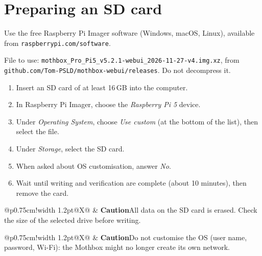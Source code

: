 \documentclass[10pt,a4paper]{article}
\makeatletter
\newcommand{\avert}[2]{%
  \par\smallskip\noindent
  \begin{tabularx}{\linewidth}{@{}p{0.75cm}!{\color{black}\vrule width 1.2pt}@{\hspace{6pt}}X@{}}
  \raisebox{-2pt}{\Large\faExclamationTriangle} & \textbf{#1}\quad #2
  \end{tabularx}\par\smallskip}
\makeatother
\begin{document}
\newpage
\begin{minipage}[t]{0.52\textwidth}
\vspace{0pt}
\section{Preparing an SD card}
Use the free Raspberry Pi Imager software (Windows, macOS, Linux), available from \texttt{raspberrypi.com/software}.

File to use: \texttt{mothbox\_Pro\_Pi5\_v5.2.1-webui\_2026-11-27-v4.img.xz}, from \texttt{github.com/Tom-PSLD/mothbox-webui/releases}. Do not decompress it.
\begin{enumerate}
  \item Insert an SD card of at least 16\,GB into the computer.
  \item In Raspberry Pi Imager, choose the \emph{Raspberry Pi 5} device.
  \item Under \emph{Operating System}, choose \emph{Use custom} (at the bottom of the list), then select the file.
  \item Under \emph{Storage}, select the SD card.
  \item When asked about OS customisation, answer \emph{No}.
  \item Wait until writing and verification are complete (about 10 minutes), then remove the card.
\end{enumerate}
\avert{Caution}{All data on the SD card is erased. Check the size of the selected drive before writing.}
\avert{Caution}{Do not customise the OS (user name, password, Wi-Fi): the Mothbox might no longer create its own network.}
\end{minipage}\hfill
\end{document}
